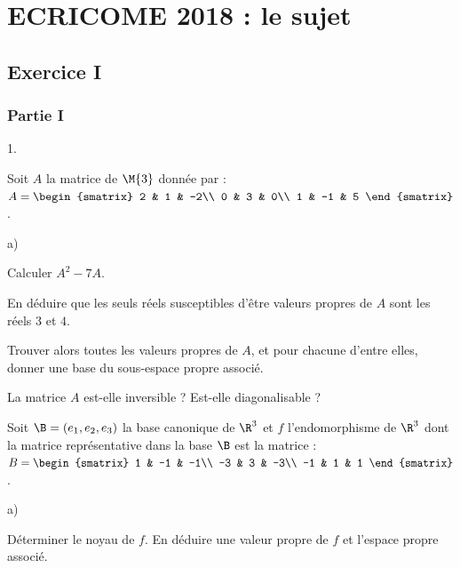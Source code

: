 \chapter*{ECRICOME 2018 : le sujet}
  
%

\section*{Exercice I}

\subsection*{Partie I}

\begin{noliste}{1.}
  \setlength{\itemsep}{4mm}
\item Soit $A$ la matrice de $\M{3}$ donnée par : $A =
  \begin{smatrix}
    2 & 1 & -2\\
    0 & 3 & 0\\
    1 & -1 & 5
  \end{smatrix}
  $.
  \begin{noliste}{a)}
    \setlength{\itemsep}{2mm}
  \item Calculer $A^{2}-7A$.

    

  \item En déduire que les seuls réels susceptibles d'être valeurs
    propres de $A$ sont les réels $3$ et $4$.

    




  \item Trouver alors toutes les valeurs propres de $A$, et pour
    chacune d'entre elles, donner une base du sous-espace propre
    associé.

    

  \item La matrice $A$ est-elle inversible ? Est-elle diagonalisable ?

    

  \end{noliste}

\item Soit $\B = (e_{1},e_{2},e_{3})$ la base canonique de $\R^{3}$ et
  $f$ l'endomorphisme de $\R^{3}$ dont la matrice représentative dans
  la base $\B$ est la matrice : $B =
  \begin{smatrix}
    1 & -1 & -1\\
    -3 & 3 & -3\\
    -1 & 1 & 1
  \end{smatrix}
  $.
  \begin{noliste}{a)}
    \setlength{\itemsep}{2mm}
  \item Déterminer le noyau de $f$. En déduire une valeur propre de
    $f$ et l'espace propre associé.


\end{noliste}
\end{noliste}
